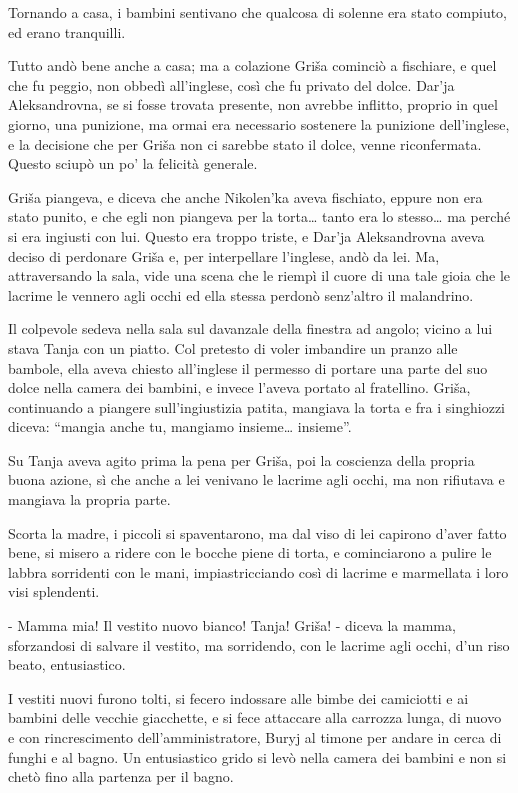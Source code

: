 Tornando a casa, i bambini sentivano che qualcosa di solenne era stato compiuto, ed erano tranquilli. 

Tutto andò bene anche a casa; ma a colazione Griša cominciò a fischiare, e quel che fu peggio, non obbedì all'inglese, così che fu privato del dolce. Dar'ja Aleksandrovna, se si fosse trovata presente, non avrebbe inflitto, proprio in quel giorno, una punizione, ma ormai era necessario sostenere la punizione dell'inglese, e la decisione che per Griša non ci sarebbe stato il dolce, venne riconfermata. Questo sciupò un po' la felicità generale. 

Griša piangeva, e diceva che anche Nikolen'ka aveva fischiato, eppure non era stato punito, e che egli non piangeva per la torta\ldots{} tanto era lo stesso\ldots{} ma perché si era ingiusti con lui. Questo era troppo triste, e Dar'ja Aleksandrovna aveva deciso di perdonare Griša e, per interpellare l'inglese, andò da lei. Ma, attraversando la sala, vide una scena che le riempì il cuore di una tale gioia che le lacrime le vennero agli occhi ed ella stessa perdonò senz'altro il malandrino. 

Il colpevole sedeva nella sala sul davanzale della finestra ad angolo; vicino a lui stava Tanja con un piatto. Col pretesto di voler imbandire un pranzo alle bambole, ella aveva chiesto all'inglese il permesso di portare una parte del suo dolce nella camera dei bambini, e invece l'aveva portato al fratellino. Griša, continuando a piangere sull'ingiustizia patita, mangiava la torta e fra i singhiozzi diceva: ``mangia anche tu, mangiamo insieme\ldots{} insieme''. 

Su Tanja aveva agito prima la pena per Griša, poi la coscienza della propria buona azione, sì che anche a lei venivano le lacrime agli occhi, ma non rifiutava e mangiava la propria parte. 

Scorta la madre, i piccoli si spaventarono, ma dal viso di lei capirono d'aver fatto bene, si misero a ridere con le bocche piene di torta, e cominciarono a pulire le labbra sorridenti con le mani, impiastricciando così di lacrime e marmellata i loro visi splendenti. 

- Mamma mia! Il vestito nuovo bianco! Tanja! Griša! - diceva la mamma, sforzandosi di salvare il vestito, ma sorridendo, con le lacrime agli occhi, d'un riso beato, entusiastico. 

I vestiti nuovi furono tolti, si fecero indossare alle bimbe dei camiciotti e ai bambini delle vecchie giacchette, e si fece attaccare alla carrozza lunga, di nuovo e con rincrescimento dell'amministratore, Buryj al timone per andare in cerca di funghi e al bagno. Un entusiastico grido si levò nella camera dei bambini e non si chetò fino alla partenza per il bagno. 

